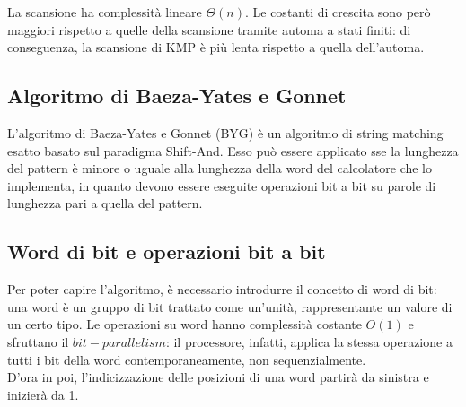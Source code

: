 La scansione ha complessità lineare $\Theta(n)$. Le costanti di crescita sono però maggiori rispetto a quelle della scansione tramite automa a stati finiti: di conseguenza, la scansione di KMP è più lenta rispetto a quella dell'automa.



\subsection*{Algoritmo di Baeza-Yates e Gonnet}
L'algoritmo di Baeza-Yates e Gonnet (BYG) è un algoritmo di string matching esatto basato sul paradigma Shift-And.
Esso può essere applicato sse la lunghezza del pattern è minore o uguale alla lunghezza della word del calcolatore che lo implementa, in quanto devono essere eseguite operazioni bit a bit su parole di lunghezza pari a quella del pattern.

\subsection{Word di bit e operazioni bit a bit}
Per poter capire l'algoritmo, è necessario introdurre il concetto di word di bit: una word è un gruppo di bit trattato come un'unità, rappresentante un valore di un certo tipo.
Le operazioni su word hanno complessità costante $O(1)$ e sfruttano il $bit-parallelism$: il processore, infatti, applica la stessa operazione a tutti i bit della word contemporaneamente, non sequenzialmente.\\
D'ora in poi, l'indicizzazione delle posizioni di una word partirà da sinistra e inizierà da 1.

